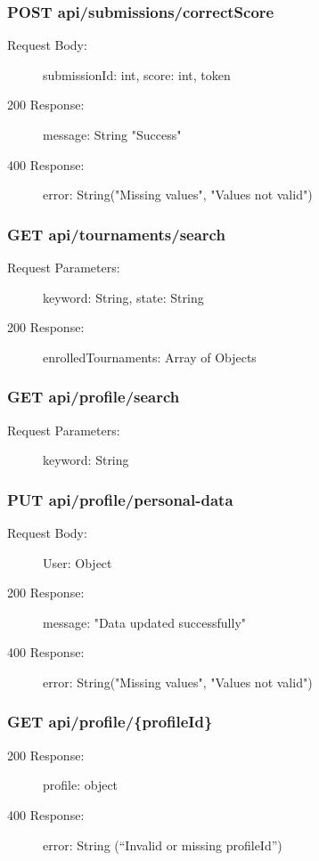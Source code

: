 \documentclass{Configuration_Files/Template}
\begin{document}
\subsubsection{POST api/submissions/correctScore}
\begin{description}
    \item[Request Body:] submissionId: int, score: int, token
    \item[200 Response:] message: String "Success"
    \item[400 Response:] error: String("Missing values", "Values not valid")
\end{description}


\subsubsection{GET api/tournaments/search}
\begin{description}
    \item[Request Parameters:] keyword: String, state: String
    \item[200 Response:] enrolledTournaments: Array of Objects
\end{description}

\subsubsection{GET api/profile/search}
\begin{description}
    \item[Request Parameters:] keyword: String
\end{description}

\subsubsection{PUT api/profile/personal-data}
\begin{description}
    \item[Request Body:] User: Object
    \item[200 Response:] message: "Data updated successfully"
    \item[400 Response:] error: String("Missing values", "Values not valid")
\end{description}

\subsubsection{GET api/profile/\{profileId\}}
\begin{description}
    
    \item[200 Response:] profile: object
    \item[400 Response:] error: String (“Invalid or missing profileId”)
\end{description}
\end{document}
